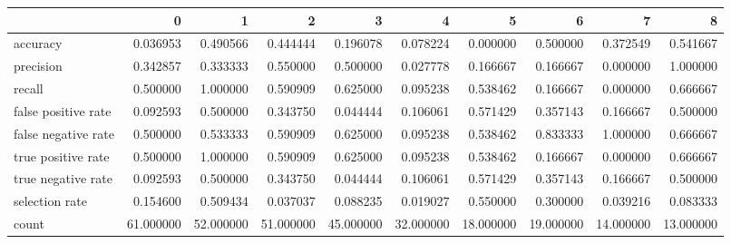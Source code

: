 \begin{tabular}{lrrrrrrrrr}
\toprule
{} &          0 &          1 &          2 &          3 &          4 &          5 &          6 &          7 &          8 \\
\midrule
accuracy            &   0.036953 &   0.490566 &   0.444444 &   0.196078 &   0.078224 &   0.000000 &   0.500000 &   0.372549 &   0.541667 \\
precision           &   0.342857 &   0.333333 &   0.550000 &   0.500000 &   0.027778 &   0.166667 &   0.166667 &   0.000000 &   1.000000 \\
recall              &   0.500000 &   1.000000 &   0.590909 &   0.625000 &   0.095238 &   0.538462 &   0.166667 &   0.000000 &   0.666667 \\
false positive rate &   0.092593 &   0.500000 &   0.343750 &   0.044444 &   0.106061 &   0.571429 &   0.357143 &   0.166667 &   0.500000 \\
false negative rate &   0.500000 &   0.533333 &   0.590909 &   0.625000 &   0.095238 &   0.538462 &   0.833333 &   1.000000 &   0.666667 \\
true positive rate  &   0.500000 &   1.000000 &   0.590909 &   0.625000 &   0.095238 &   0.538462 &   0.166667 &   0.000000 &   0.666667 \\
true negative rate  &   0.092593 &   0.500000 &   0.343750 &   0.044444 &   0.106061 &   0.571429 &   0.357143 &   0.166667 &   0.500000 \\
selection rate      &   0.154600 &   0.509434 &   0.037037 &   0.088235 &   0.019027 &   0.550000 &   0.300000 &   0.039216 &   0.083333 \\
count               &  61.000000 &  52.000000 &  51.000000 &  45.000000 &  32.000000 &  18.000000 &  19.000000 &  14.000000 &  13.000000 \\
\bottomrule
\end{tabular}
